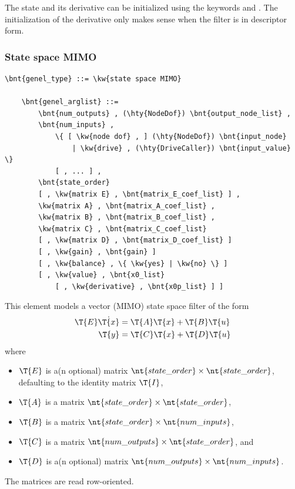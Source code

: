The state and its derivative can be initialized using the keywords 
and .
The initialization of the derivative only makes sense when the filter
is in descriptor form.

\subsubsection{State space MIMO}
\label{sec:EL:GENEL:STATE-SPACE-MIMO}
\begin{Verbatim}[commandchars=\\\{\}]
    \bnt{genel_type} ::= \kw{state space MIMO}

    \bnt{genel_arglist} ::=
        \bnt{num_outputs} , (\hty{NodeDof}) \bnt{output_node_list} ,
        \bnt{num_inputs} ,
            \{ [ \kw{node dof} , ] (\hty{NodeDof}) \bnt{input_node}
                | \kw{drive} , (\hty{DriveCaller}) \bnt{input_value} \}
            [ , ... ] ,
        \bnt{state_order}
        [ , \kw{matrix E} , \bnt{matrix_E_coef_list} ] ,
        \kw{matrix A} , \bnt{matrix_A_coef_list} ,
        \kw{matrix B} , \bnt{matrix_B_coef_list} ,
        \kw{matrix C} , \bnt{matrix_C_coef_list}
        [ , \kw{matrix D} , \bnt{matrix_D_coef_list} ]
        [ , \kw{gain} , \bnt{gain} ]
        [ , \kw{balance} , \{ \kw{yes} | \kw{no} \} ]
        [ , \kw{value} , \bnt{x0_list}
            [ , \kw{derivative} , \bnt{x0p_list} ] ]
\end{Verbatim}
This element models a vector (MIMO) state space filter of the form
\begin{align*}
        \T{E} \dot{\T{x}} &= \T{A}\T{x}+\T{B}\T{u} \\
	\T{y} &= \T{C}\T{x}+\T{D}\T{u}
\end{align*}
where
\begin{itemize}
\item $\T{E}$ is a(n optional) matrix
	$\nt{state\_order} \times \nt{state\_order}$, defaulting to the identity matrix $\T{I}$,
\item $\T{A}$ is a matrix
	$\nt{state\_order} \times \nt{state\_order}$,
\item $\T{B}$ is a matrix
	$\nt{state\_order} \times \nt{num\_inputs}$,
\item $\T{C}$ is a matrix
	$\nt{num\_outputs} \times \nt{state\_order}$, and
\item $\T{D}$ is a(n optional) matrix
	$\nt{num\_outputs} \times \nt{num\_inputs}$.
\end{itemize}
The matrices are read row-oriented.

